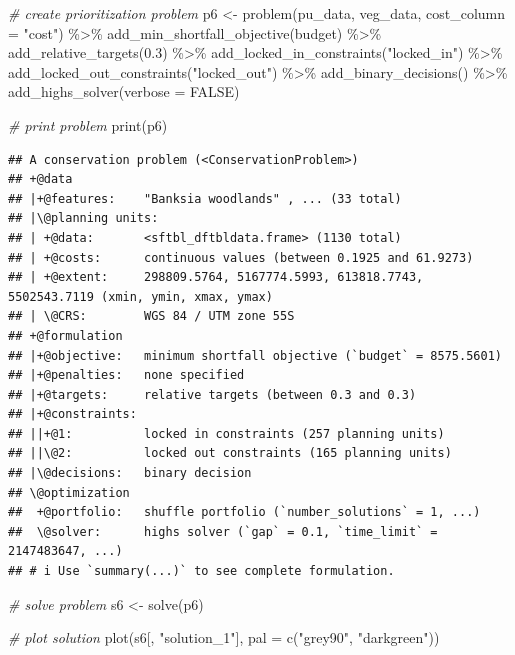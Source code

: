\documentclass[
  12pt,
]{book}
\newenvironment{Shaded}{\begin{snugshade}}{\end{snugshade}}
\newcommand{\AttributeTok}[1]{\textcolor[rgb]{0.77,0.63,0.00}{#1}}
\newcommand{\CommentTok}[1]{\textcolor[rgb]{0.56,0.35,0.01}{\textit{#1}}}
\newcommand{\ConstantTok}[1]{\textcolor[rgb]{0.00,0.00,0.00}{#1}}
\newcommand{\FloatTok}[1]{\textcolor[rgb]{0.00,0.00,0.81}{#1}}
\newcommand{\FunctionTok}[1]{\textcolor[rgb]{0.00,0.00,0.00}{#1}}
\newcommand{\NormalTok}[1]{#1}
\newcommand{\OtherTok}[1]{\textcolor[rgb]{0.56,0.35,0.01}{#1}}
\newcommand{\SpecialCharTok}[1]{\textcolor[rgb]{0.00,0.00,0.00}{#1}}
\newcommand{\StringTok}[1]{\textcolor[rgb]{0.31,0.60,0.02}{#1}}
\begin{document}
\begin{Shaded}
\begin{Highlighting}[]
\CommentTok{\# create prioritization problem}
\NormalTok{p6 }\OtherTok{\textless{}{-}}
  \FunctionTok{problem}\NormalTok{(pu\_data, veg\_data, }\AttributeTok{cost\_column =} \StringTok{"cost"}\NormalTok{) }\SpecialCharTok{\%\textgreater{}\%}
  \FunctionTok{add\_min\_shortfall\_objective}\NormalTok{(budget) }\SpecialCharTok{\%\textgreater{}\%}
  \FunctionTok{add\_relative\_targets}\NormalTok{(}\FloatTok{0.3}\NormalTok{) }\SpecialCharTok{\%\textgreater{}\%}
  \FunctionTok{add\_locked\_in\_constraints}\NormalTok{(}\StringTok{"locked\_in"}\NormalTok{) }\SpecialCharTok{\%\textgreater{}\%}
  \FunctionTok{add\_locked\_out\_constraints}\NormalTok{(}\StringTok{"locked\_out"}\NormalTok{) }\SpecialCharTok{\%\textgreater{}\%}
  \FunctionTok{add\_binary\_decisions}\NormalTok{() }\SpecialCharTok{\%\textgreater{}\%}
  \FunctionTok{add\_highs\_solver}\NormalTok{(}\AttributeTok{verbose =} \ConstantTok{FALSE}\NormalTok{)}

\CommentTok{\# print problem}
\FunctionTok{print}\NormalTok{(p6)}
\end{Highlighting}
\end{Shaded}

\begin{verbatim}
## A conservation problem (<ConservationProblem>)
## +@data
## |+@features:    "Banksia woodlands" , ... (33 total)
## |\@planning units:
## | +@data:       <sftbl_dftbldata.frame> (1130 total)
## | +@costs:      continuous values (between 0.1925 and 61.9273)
## | +@extent:     298809.5764, 5167774.5993, 613818.7743, 5502543.7119 (xmin, ymin, xmax, ymax)
## | \@CRS:        WGS 84 / UTM zone 55S
## +@formulation
## |+@objective:   minimum shortfall objective (`budget` = 8575.5601)
## |+@penalties:   none specified
## |+@targets:     relative targets (between 0.3 and 0.3)
## |+@constraints:
## ||+@1:          locked in constraints (257 planning units)
## ||\@2:          locked out constraints (165 planning units)
## |\@decisions:   binary decision
## \@optimization
##  +@portfolio:   shuffle portfolio (`number_solutions` = 1, ...)
##  \@solver:      highs solver (`gap` = 0.1, `time_limit` = 2147483647, ...)
## # i Use `summary(...)` to see complete formulation.
\end{verbatim}

\begin{Shaded}
\begin{Highlighting}[]
\CommentTok{\# solve problem}
\NormalTok{s6 }\OtherTok{\textless{}{-}} \FunctionTok{solve}\NormalTok{(p6)}

\CommentTok{\# plot solution}
\FunctionTok{plot}\NormalTok{(s6[, }\StringTok{"solution\_1"}\NormalTok{], }\AttributeTok{pal =} \FunctionTok{c}\NormalTok{(}\StringTok{"grey90"}\NormalTok{, }\StringTok{"darkgreen"}\NormalTok{))}
\end{Highlighting}
\end{Shaded}
\end{document}
